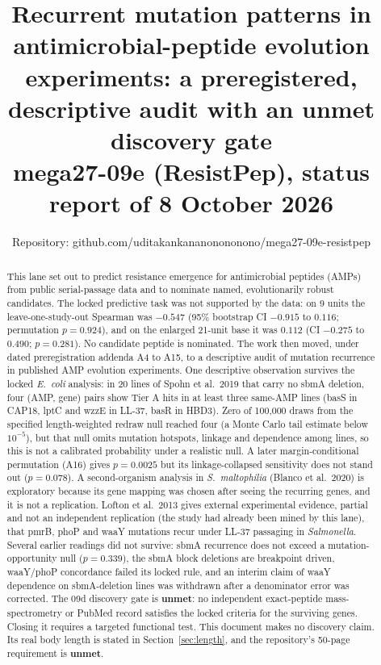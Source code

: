 \documentclass[11pt,letterpaper]{article}
\title{Recurrent mutation patterns in antimicrobial-peptide evolution experiments: a preregistered, descriptive audit with an unmet discovery gate\\[2pt]\large mega27-09e (ResistPep), status report of 8 October 2026}
\author{Repository: github.com/uditakankananonononono/mega27-09e-resistpep}
\date{}
\begin{document}
\maketitle
\begin{abstract}
\noindent This lane set out to predict resistance emergence for antimicrobial peptides (AMPs) from public serial-passage data and to nominate named, evolutionarily robust candidates. The locked predictive task was not supported by the data: on 9 units the leave-one-study-out Spearman was $-0.547$ (95\% bootstrap CI $-0.915$ to $0.116$; permutation $p=0.924$), and on the enlarged 21-unit base it was $0.112$ (CI $-0.275$ to $0.490$; $p=0.281$). No candidate peptide is nominated. The work then moved, under dated preregistration addenda A4 to A15, to a descriptive audit of mutation recurrence in published AMP evolution experiments. One descriptive observation survives the locked \textit{E.\ coli} analysis: in 20 lines of Spohn et al.\ 2019 that carry no sbmA deletion, four (AMP, gene) pairs show Tier A hits in at least three same-AMP lines (basS in CAP18, lptC and wzzE in LL-37, basR in HBD3). Zero of 100{,}000 draws from the specified length-weighted redraw null reached four (a Monte Carlo tail estimate below $10^{-5}$), but that null omits mutation hotspots, linkage and dependence among lines, so this is not a calibrated probability under a realistic null. A later margin-conditional permutation (A16) gives $p=0.0025$ but its linkage-collapsed sensitivity does not stand out ($p=0.078$). A second-organism analysis in \textit{S.\ maltophilia} (Blanco et al.\ 2020) is exploratory because its gene mapping was chosen after seeing the recurring genes, and it is not a replication. Lofton et al.\ 2013 gives external experimental evidence, partial and not an independent replication (the study had already been mined by this lane), that pmrB, phoP and waaY mutations recur under LL-37 passaging in \textit{Salmonella}. Several earlier readings did not survive: sbmA recurrence does not exceed a mutation-opportunity null ($p=0.339$), the sbmA block deletions are breakpoint driven, waaY/phoP concordance failed its locked rule, and an interim claim of waaY dependence on sbmA-deletion lines was withdrawn after a denominator error was corrected. The 09d discovery gate is \textbf{unmet}: no independent exact-peptide mass-spectrometry or PubMed record satisfies the locked criteria for the surviving genes. Closing it requires a targeted functional test. This document makes no discovery claim. Its real body length is stated in Section~\ref{sec:length}, and the repository's 50-page requirement is \textbf{unmet}.
\end{abstract}
\end{document}
